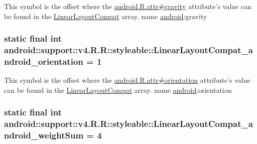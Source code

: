 This symbol is the offset where the \hyperlink{}{android.R.attr\#gravity} attribute's value can be found in the \hyperlink{classandroid_1_1support_1_1v4_1_1_r_1_1styleable_d67ed8d09a6471da7a8c3ba1552dad7e}{LinearLayoutCompat} array.  name \hyperlink{namespaceandroid}{android}:gravity \hypertarget{classandroid_1_1support_1_1v4_1_1_r_1_1styleable_2fab5c4e37d706c344112f0c3adfdeda}{
\subsubsection[{LinearLayoutCompat\_\-android\_\-orientation}]{\setlength{\rightskip}{0pt plus 5cm}static final int android::support::v4.R.R::styleable::LinearLayoutCompat\_\-android\_\-orientation = 1}}
\label{classandroid_1_1support_1_1v4_1_1_r_1_1styleable_2fab5c4e37d706c344112f0c3adfdeda}


This symbol is the offset where the \hyperlink{}{android.R.attr\#orientation} attribute's value can be found in the \hyperlink{classandroid_1_1support_1_1v4_1_1_r_1_1styleable_d67ed8d09a6471da7a8c3ba1552dad7e}{LinearLayoutCompat} array.  name \hyperlink{namespaceandroid}{android}:orientation \hypertarget{classandroid_1_1support_1_1v4_1_1_r_1_1styleable_8f749702d3ee9fc29c39a04661dd9b91}{
\subsubsection[{LinearLayoutCompat\_\-android\_\-weightSum}]{\setlength{\rightskip}{0pt plus 5cm}static final int android::support::v4.R.R::styleable::LinearLayoutCompat\_\-android\_\-weightSum = 4}}
\label{classandroid_1_1support_1_1v4_1_1_r_1_1styleable_8f749702d3ee9fc29c39a04661dd9b91}


